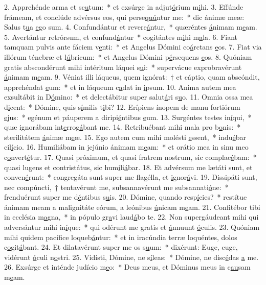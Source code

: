 2. Apprehénde arma et sc\uline{u}tum:~* et exsúrge in adjut\uline{ó}rium m\uline{i}hi.
3. Effúnde frámeam, et conclúde advérsus eos, qui perse\uline{quú}ntur me:~* dic ánimæ meæ: Salus t\uline{u}a \uline{e}go sum.
4. Confundántur et revere\uline{á}ntur,~* quæréntes \uline{á}nimam m\uline{e}am.
5. Avertántur retrórsum, et confund\uline{á}ntur~* cogitántes m\uline{i}hi m\uline{a}la.
6. Fiant tamquam pulvis ante fáciem v\uline{e}nti:~* et Angelus Dómini co\uline{á}rctans \uline{e}os.
7. Fiat via illórum ténebræ et l\uline{ú}bricum:~* et Angelus Dómini p\uline{é}rsequens \uline{e}os.
8. Quóniam gratis abscondérunt mihi intéritum láquei s\uline{u}i:~* supervácue exprobravérunt \uline{á}nimam m\uline{e}am.
9. Véniat illi láqueus, quem ignórat:~† et cáptio, quam abscóndit, apprehéndat \uline{e}um:~* et in láqueum c\uline{a}dat in \uline{i}psum.
10. Anima autem mea exsultábit in D\uline{ó}mino:~* et delectábitur super salut\uline{á}ri s\uline{u}o.
11. Omnia ossa mea d\uline{i}cent:~* Dómine, quis s\uline{í}milis t\uline{i}bi?
12. Erípiens ínopem de manu fortiórum \uline{e}jus:~* egénum et páuperem a diripi\uline{é}ntibus \uline{e}um.
13. Surgéntes testes in\uline{í}qui,~* quæ ignorábam int\uline{e}rrog\uline{á}bant me.
14. Retribuébant mihi mala pro b\uline{o}nis:~* sterilitátem \uline{á}nimæ m\uline{e}æ.
15. Ego autem cum mihi molésti \uline{e}ssent,~* indu\uline{é}bar cil\uline{í}cio.
16. Humiliábam in jejúnio ánimam m\uline{e}am:~* et orátio mea in sinu meo c\uline{o}nvert\uline{é}tur.
17. Quasi próximum, et quasi fratrem nostrum, sic complac\uline{é}bam:~* quasi lugens et contristátus, sic hum\uline{i}li\uline{á}bar.
18. Et advérsum me lætáti sunt, et conven\uline{é}runt:~* congregáta sunt super me flagélla, et \uline{i}gnor\uline{á}vi.
19. Dissipáti sunt, nec compúncti,~† tentavérunt me, subsannavérunt me subsannati\uline{ó}ne:~* frenduérunt super me d\uline{é}ntibus s\uline{u}is.
20. Dómine, quando resp\uline{í}cies?~* restítue ánimam meam a malignitáte eórum, a leónibus \uline{ú}nicam m\uline{e}am.
21. Confitébor tibi in ecclésia m\uline{a}gna,~* in pópulo gr\uline{a}vi laud\uline{á}bo te.
22. Non supergáudeant mihi qui adversántur mihi in\uline{í}que:~* qui odérunt me gratis et \uline{á}nnuunt \uline{ó}culis.
23. Quóniam mihi quidem pacífice loqueb\uline{á}ntur:~* et in iracúndia terræ loquéntes, dolos c\uline{o}git\uline{á}bant.
24. Et dilatavérunt super me os s\uline{u}um:~* dixérunt: Euge, euge, vidérunt \uline{ó}culi n\uline{o}stri.
25. Vidísti, Dómine, ne s\uline{í}leas:~* Dómine, ne disc\uline{é}das \uline{a} me.
26. Exsúrge et inténde judício m\uline{e}o:~* Deus meus, et Dóminus meus in c\uline{au}sam m\uline{e}am.
